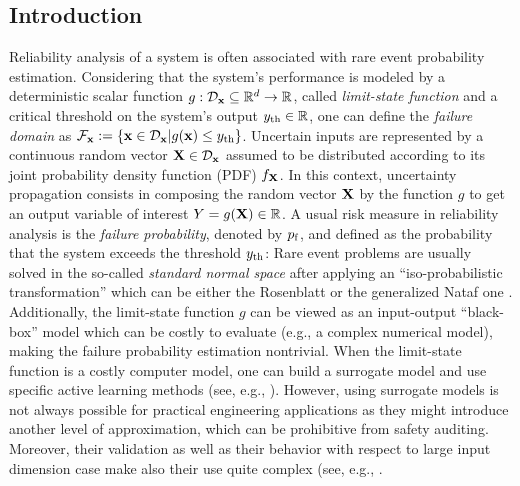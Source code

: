 \subsection{Introduction}
Reliability analysis of a system is often associated with rare event probability estimation. 
Considering that the system's performance is modeled by a deterministic scalar function $g: \mathcal{D}_{\bf x} \subseteq \mathbb{R}^d \rightarrow \mathbb{R}$, called \emph{limit-state function} and a critical threshold on the system's output $y_\mathrm{th}\in\mathbb{R}$, one can define the \emph{failure domain} as $\mathcal{F}_{{\bf x}} := \{{\bf x} \in \mathcal{D}_{\bf x} | g({\bf x}) \leq y_\mathrm{th}\}$. 
Uncertain inputs are represented by a continuous random vector ${\bf X} \in \mathcal{D}_{\bf x}$ assumed to be distributed according to its joint probability density function (PDF) $f_{\bf X}$. 
In this context, uncertainty propagation consists in composing the random vector ${\bf X}$ by the function $g$ to get an output variable of interest $Y = g({\bf X}) \in \mathbb{R}$. 
A usual risk measure in reliability analysis is the \emph{failure probability}, denoted by $p_\mathrm{f}$, and defined as the probability that the system exceeds the threshold $y_\mathrm{th}$:
Rare event problems are usually solved in the so-called \emph{standard normal space} after applying an ``iso-probabilistic transformation'' which can be either the Rosenblatt or the generalized Nataf one \citep{Lebrun_PHD_2013}.
Additionally, the limit-state function $g$ can be viewed as an input-output ``black-box'' model which can be costly to evaluate (e.g., a complex numerical model), making the failure probability estimation nontrivial. 
When the limit-state function is a costly computer model, one can build a surrogate model and use specific active learning methods (see, e.g., \citet{moustapha_ss_2022}). 
However, using surrogate models is not always possible for practical engineering applications as they might introduce another level of approximation, which can be prohibitive from safety auditing. 
Moreover, their validation as well as their behavior with respect to large input dimension case make also their use quite complex (see, e.g.,  \citep{Marrel_Iooss_Chab_ICSCREAM_2020}.

